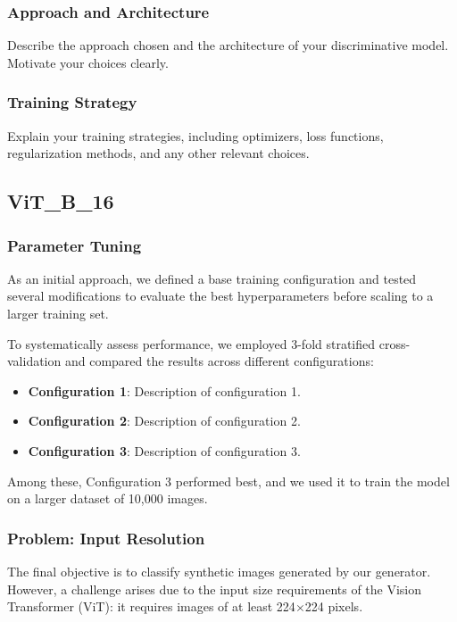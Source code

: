 \documentclass[a4paper,11pt]{article}
\begin{document}
\subsubsection{Approach and Architecture}
Describe the approach chosen and the architecture of your discriminative model. Motivate your choices clearly.

\subsubsection{Training Strategy}
Explain your training strategies, including optimizers, loss functions, regularization methods, and any other relevant choices.

\subsection{ViT\_B\_16}

\subsubsection{Parameter Tuning}
As an initial approach, we defined a base training configuration and tested several modifications to evaluate the best hyperparameters before scaling to a larger training set.

To systematically assess performance, we employed 3-fold stratified cross-validation and compared the results across different configurations:

\begin{itemize}
    \item \textbf{Configuration 1}: Description of configuration 1.
    \item \textbf{Configuration 2}: Description of configuration 2.
    \item \textbf{Configuration 3}: Description of configuration 3.
\end{itemize}

Among these, Configuration 3 performed best, and we used it to train the model on a larger dataset of 10,000 images.

\subsubsection{Problem: Input Resolution}
The final objective is to classify synthetic images generated by our generator. However, a challenge arises due to the input size requirements of the Vision Transformer (ViT): it requires images of at least 224$\times$224 pixels.
\end{document}

